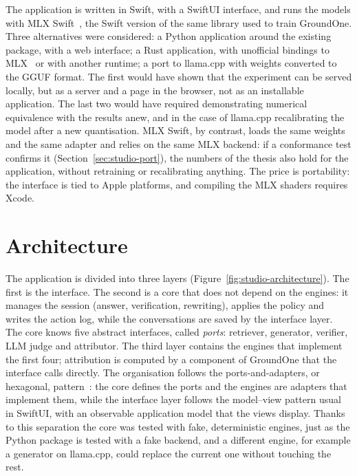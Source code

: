 The application is written in Swift, with a SwiftUI interface, and runs the models with MLX Swift~\cite{apple2026mlxswift,
apple2026mlxswiftlm}, the Swift version of the same library used to train GroundOne. Three alternatives were considered:
a Python application around the existing package, with a web interface; a Rust application, with unofficial bindings to
MLX~\cite{oxiglade2026mlxrs} or with another runtime; a port to llama.cpp with weights converted to the GGUF format. The
first would have shown that the experiment can be served locally, but as a server and a page in the browser, not as an
installable application. The last two would have required demonstrating numerical equivalence with the results anew,
and in the case of llama.cpp recalibrating the model after a new quantisation. MLX Swift, by contrast, loads the same
weights and the same adapter and relies on the same MLX backend: if a conformance test confirms it
(Section~\ref{sec:studio-port}), the numbers of the thesis also hold for the application, without retraining or
recalibrating anything. The price is portability: the interface is tied to Apple platforms, and compiling the MLX
shaders requires Xcode.

\section{Architecture}
\label{sec:studio-architecture}

The application is divided into three layers (Figure~\ref{fig:studio-architecture}). The first is the interface. The
second is a core that does not depend on the engines: it manages the session (answer, verification, rewriting), applies the policy and writes the action log, while the conversations are saved by the interface layer. The core knows five abstract interfaces, called \emph{ports}: retriever, generator, verifier, LLM judge and attributor. The third layer contains the engines that implement the first four; attribution is computed by a component of GroundOne that the interface calls directly. The organisation follows the ports-and-adapters, or hexagonal, pattern~\cite{cockburn2005hexagonal}: the core defines the ports and the engines are adapters that implement them, while the interface layer follows the model--view pattern usual in SwiftUI, with an observable application model that the views display. Thanks
to this separation the core was tested with fake, deterministic engines, just as the Python package is tested with a
fake backend, and a different engine, for example a generator on llama.cpp, could replace the current one without
touching the rest.

